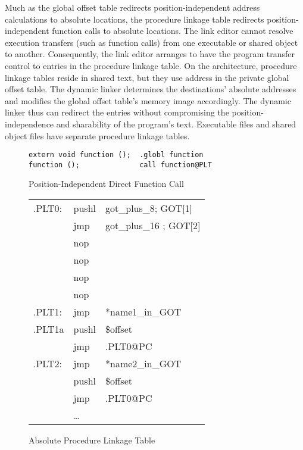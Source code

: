 
Much as the global offset table redirects position-independent address
calculations to absolute locations, the procedure linkage table
redirects position-independent function calls to absolute locations.
The link editor cannot resolve execution transfers (such as function
calls) from one executable or shared object to another.  Consequently,
the link editor arranges to have the program transfer control to
entries in the procedure linkage table.  On the \xARCH architecture,
procedure linkage tables reside in shared text, but they use address
in the private global offset table.  The dynamic linker determines the
destinations' absolute addresses and modifies the global offset
table's memory image accordingly.  The dynamic linker thus can
redirect the entries without compromising the position-independence
and sharability of the program's text.  Executable files and shared
object files have separate procedure linkage tables.  



\begin{figure}[H]
\caption{Position-Independent Direct Function Call}
\begin{verbatim}
extern void function ();  .globl function
function ();              call function@PLT
\end{verbatim}
\end{figure}

\begin{figure}[H]
\caption{Absolute Procedure Linkage Table}
\begin{tabular}{lll}
.PLT0: & pushl & got\_plus\_8; GOT[1]\\
& jmp &got\_plus\_16 ; GOT[2] \\
& nop & \\
& nop & \\
& nop & \\
& nop & \\
.PLT1: & jmp & *name1\_in\_GOT\\
.PLT1a& pushl & \$offset \\
&jmp &.PLT0@PC \\
.PLT2: & jmp& *name2\_in\_GOT\\
&pushl & \$offset \\
& jmp & .PLT0@PC \\
&\dots\\
\end{tabular}
\end{figure}

